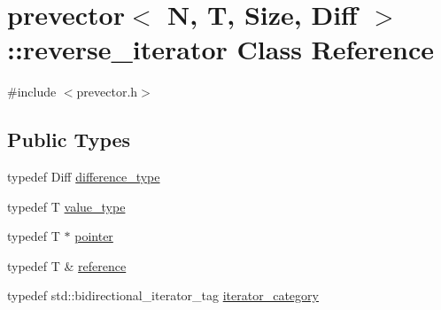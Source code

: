 \hypertarget{classprevector_1_1reverse__iterator}{}\section{prevector$<$ N, T, Size, Diff $>$\+:\+:reverse\+\_\+iterator Class Reference}
\label{classprevector_1_1reverse__iterator}


{\ttfamily \#include $<$prevector.\+h$>$}

\subsection*{Public Types}
\begin{DoxyCompactItemize}
\item 
typedef Diff \mbox{\hyperlink{classprevector_1_1reverse__iterator_a365f89bb315bdb54cbbfafbce8b29e0a}{difference\+\_\+type}}
\item 
typedef T \mbox{\hyperlink{classprevector_1_1reverse__iterator_a3d18023700976ec30e7d6076285d3253}{value\+\_\+type}}
\item 
typedef T $\ast$ \mbox{\hyperlink{classprevector_1_1reverse__iterator_affd9dcd9ef382da1f07f4194997f5a66}{pointer}}
\item 
typedef T \& \mbox{\hyperlink{classprevector_1_1reverse__iterator_acc7b6fc472e53e0e33b42a089499b475}{reference}}
\item 
typedef std\+::bidirectional\+\_\+iterator\+\_\+tag \mbox{\hyperlink{classprevector_1_1reverse__iterator_a02a9858a2c1175b18e1ab1326775b8bc}{iterator\+\_\+category}}
\end{DoxyCompactItemize}
